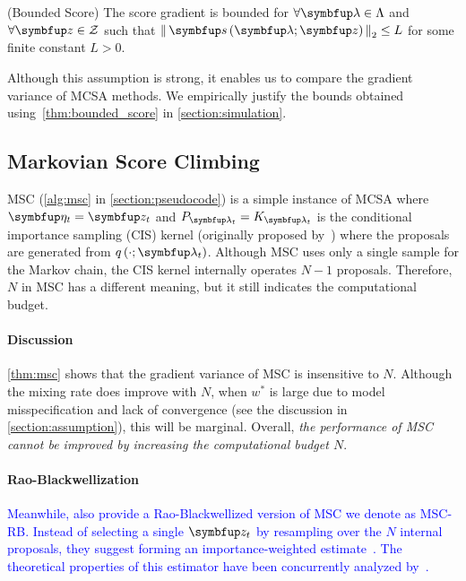 \begin{assumption}{(Bounded Score)}\label{thm:bounded_score}
  The score gradient is bounded for \(\forall \vlambda \in \Lambda\) and \(\forall \vz \in \mathcal{Z}\) such that \(\norm{\vs\left(\vlambda; \vz\right)}_2 \leq L \) for some finite constant \(L > 0\).
\end{assumption}
%
Although this assumption is strong, it enables us to compare the gradient variance of MCSA methods.
We empirically justify the bounds obtained using~\cref{thm:bounded_score} in \cref{section:simulation}.

\vspace{-0.07in}
\subsection{Markovian Score Climbing}
\vspace{-0.07in}

MSC (\cref{alg:msc} in \cref{section:pseudocode}) is a simple instance of MCSA where \(\veta_t = \vz_t\) and \(P_{\vlambda_t} = K_{\vlambda_t}\) is the conditional importance sampling (CIS) kernel (originally proposed by~\citet{andrieu_uniform_2018}) where the proposals are generated from \(q\left(\cdot; \vlambda_t\right)\).
Although MSC uses only a single sample for the Markov chain, the CIS kernel internally operates \(N-1\) proposals.
Therefore, \(N\) in MSC has a different meaning, but it still indicates the computational budget.


\vspace{0.04in}


\vspace{-0.1in}
\paragraph{Discussion}
\cref{thm:msc} shows that the gradient variance of MSC is insensitive to \(N\).
Although the mixing rate does improve with \(N\), when \(w^*\) is large due to model misspecification and lack of convergence (see the discussion in \cref{section:assumption}), this will be marginal.
Overall, \textit{the performance of MSC cannot be improved by increasing the computational budget \(N\)}.

\vspace{-0.1in}
\paragraph{Rao-Blackwellization}
\textcolor{blue}{
Meanwhile, \citeauthor{NEURIPS2020_b2070693} also provide a Rao-Blackwellized version of MSC we denote as MSC-RB.
Instead of selecting a single \(\vz_t\) by resampling over the \(N\) internal proposals, they suggest forming an importance-weighted estimate~\citep{robert_monte_2004}.
The theoretical properties of this estimator have been concurrently analyzed by~\citet{cardoso_brsnis_2022}.
}

